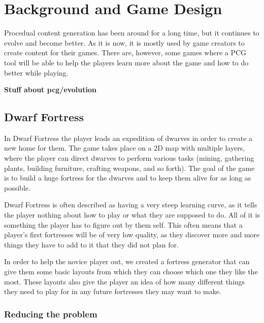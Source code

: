\section{Background and Game Design}
\label{02}

Procedual content generation has been around for a long time, but it continues to evolve and become better. As it is now, it is mostly used by game creators to create content for their games. There are, however, some games where a PCG tool will be able to help the players learn more about the game and how to do better while playing.

\textbf{Stuff about pcg/evolution}

\subsection{Dwarf Fortress}
\label{02_DF}

In Dwarf Fortress the player leads an expedition of dwarves in order to create a new home for them. The game takes place on a 2D map with multiple layers, where the player can direct dwarves to perform various tasks (mining, gathering plants, building furniture, crafting weapons, and so forth). The goal of the game is to build a huge fortress for the dwarves and to keep them alive for as long as possible.

Dwarf Fortress is often described as having a very steep learning curve, as it tells the player nothing about how to play or what they are supposed to do. All of it is something the player has to figure out by them self. This often means that a player's first fortresses will be of very low quality, as they discover more and more things they have to add to it that they did not plan for.


In order to help the novice player out, we created a fortress generator that can give them some basic layouts from which they can choose which one they like the most. These layouts also give the player an idea of how many different things they need to play for in any future fortresses they may want to make.

\subsubsection{Reducing the problem}
\label{02_DF_Reducing}

